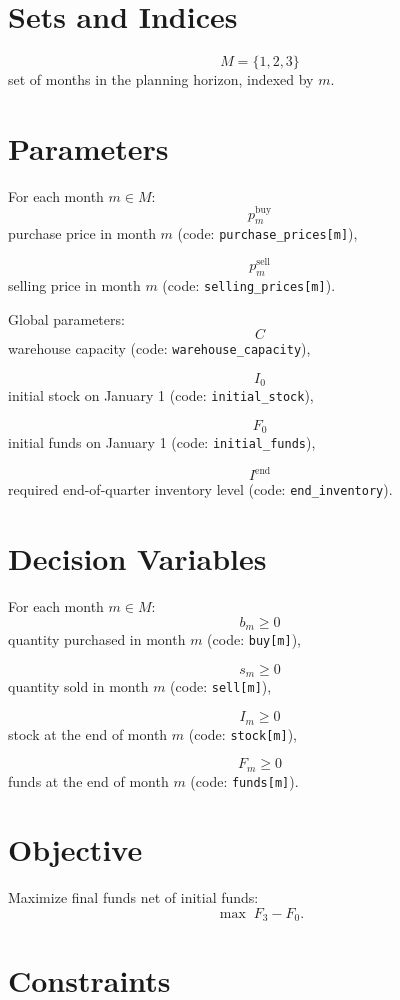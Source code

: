 \section*{Sets and Indices}

\[
M = \{1,2,3\}
\]
set of months in the planning horizon, indexed by \(m\).

\section*{Parameters}

For each month \(m \in M\):
\[
p^{\text{buy}}_m
\]
purchase price in month \(m\) (code: \texttt{purchase\_prices[m]}),

\[
p^{\text{sell}}_m
\]
selling price in month \(m\) (code: \texttt{selling\_prices[m]}).
  
Global parameters:
\[
C
\]
warehouse capacity (code: \texttt{warehouse\_capacity}),

\[
I_0
\]
initial stock on January 1 (code: \texttt{initial\_stock}),

\[
F_0
\]
initial funds on January 1 (code: \texttt{initial\_funds}),

\[
I^{\text{end}}
\]
required end-of-quarter inventory level (code: \texttt{end\_inventory}).

\section*{Decision Variables}

For each month \(m \in M\):
\[
b_m \ge 0
\]
quantity purchased in month \(m\) (code: \texttt{buy[m]}),

\[
s_m \ge 0
\]
quantity sold in month \(m\) (code: \texttt{sell[m]}),

\[
I_m \ge 0
\]
stock at the end of month \(m\) (code: \texttt{stock[m]}),

\[
F_m \ge 0
\]
funds at the end of month \(m\) (code: \texttt{funds[m]}).

\section*{Objective}

Maximize final funds net of initial funds:
\[
\max \; F_3 - F_0.
\]

\section*{Constraints}

